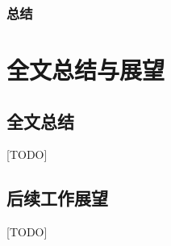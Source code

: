 \documentclass[bachelor]{thesis-uestc}
\begin{document}
	\subsection{总结}
	
	\chapter{全文总结与展望}
	\section{全文总结}
	[TODO]
	
	\section{后续工作展望}
	[TODO]
	
	\thesisacknowledgement
	[TODO]
	
	
	
	
	\thesisappendix
	
	
	\thesistranslationoriginal
\end{document}
